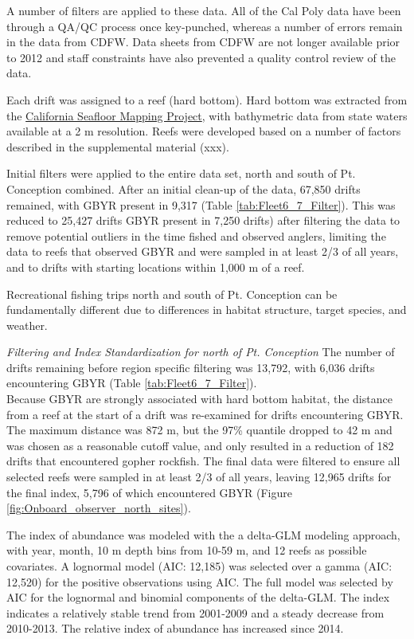 \documentclass[12pt,]{article}
\begin{document}
A number of filters are applied to these data. All of the Cal Poly data
have been through a QA/QC process once key-punched, whereas a number of
errors remain in the data from CDFW. Data sheets from CDFW are not
longer available prior to 2012 and staff constraints have also prevented
a quality control review of the data.

Each drift was assigned to a reef (hard bottom). Hard bottom was
extracted from the
\href{http://seafloor.otterlabs.org/index.html}{California Seafloor
Mapping Project}, with bathymetric data from state waters available at a
2 m resolution. Reefs were developed based on a number of factors
described in the supplemental material (xxx).

Initial filters were applied to the entire data set, north and south of
Pt. Conception combined. After an initial clean-up of the data, 67,850
drifts remained, with GBYR present in 9,317 (Table
\ref{tab:Fleet6_7_Filter}). This was reduced to 25,427 drifts GBYR
present in 7,250 drifts) after filtering the data to remove potential
outliers in the time fished and observed anglers, limiting the data to
reefs that observed GBYR and were sampled in at least 2/3 of all years,
and to drifts with starting locations within 1,000 m of a reef.

Recreational fishing trips north and south of Pt. Conception can be
fundamentally different due to differences in habitat structure, target
species, and weather.

\emph{Filtering and Index Standardization for north of Pt. Conception}
The number of drifts remaining before region specific filtering was
13,792, with 6,036 drifts encountering GBYR (Table
\ref{tab:Fleet6_7_Filter}).\\
Because GBYR are strongly associated with hard bottom habitat, the
distance from a reef at the start of a drift was re-examined for drifts
encountering GBYR. The maximum distance was 872 m, but the 97\% quantile
dropped to 42 m and was chosen as a reasonable cutoff value, and only
resulted in a reduction of 182 drifts that encountered gopher rockfish.
The final data were filtered to ensure all selected reefs were sampled
in at least 2/3 of all years, leaving 12,965 drifts for the final index,
5,796 of which encountered GBYR (Figure
\ref{fig:Onboard_observer_north_sites}).

The index of abundance was modeled with the a delta-GLM modeling
approach, with year, month, 10 m depth bins from 10-59 m, and 12 reefs
as possible covariates. A lognormal model (AIC: 12,185) was selected
over a gamma (AIC: 12,520) for the positive observations using AIC. The
full model was selected by AIC for the lognormal and binomial components
of the delta-GLM. The index indicates a relatively stable trend from
2001-2009 and a steady decrease from 2010-2013. The relative index of
abundance has increased since 2014.
\end{document}
